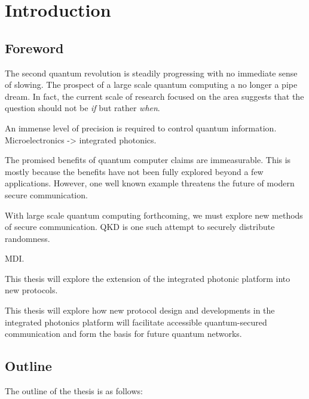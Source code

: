 %
%
\graphicspath{{./chapters/chapter01/fig01/}}

\let\textcircled=\pgftextcircled
\chapter{Introduction}
\label{chap:intro}

\section{Foreword}

The second quantum revolution is steadily progressing with no immediate sense of slowing. The prospect of a large scale quantum computing a no longer a pipe dream. In fact, the current scale of research focused on the area suggests that the question should not be \emph{if} but rather \emph{when}.

An immense level of precision is required to control quantum information. Microelectronics -> integrated photonics. 

The promised benefits of quantum computer claims are immeasurable. This is mostly because the benefits have not been fully explored beyond a few applications. However, one well known example threatens the future of modern secure communication. 

With large scale quantum computing forthcoming, we must explore new methods of secure communication. \Ac{QKD} is one such attempt to securely distribute randomness.

\Ac{MDI}.

This thesis will explore the extension of the integrated photonic platform into new protocols.

This thesis will explore how new protocol design and developments in the integrated photonics platform will facilitate accessible quantum-secured communication and form the basis for future quantum networks.

\newpage
\section{Outline}

The outline of the thesis is as follows:

